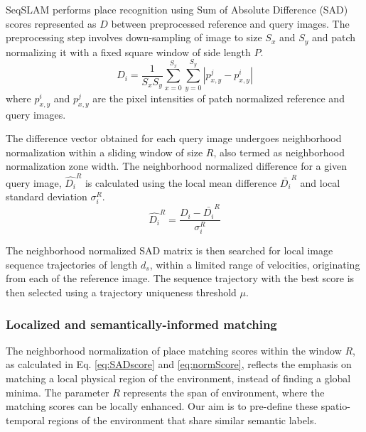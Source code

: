 \documentclass[letterpaper, 10 pt, conference]{ieeeconf}  %
\begin{document}
SeqSLAM performs place recognition using Sum of Absolute Difference (SAD) scores represented as $D$ between preprocessed reference and query images. The preprocessing step involves down-sampling of image to size $S_x$ and $S_y$ and patch normalizing it with a fixed square window of side length $P$.
\begin{equation}
 D_i = \frac{1}{S_xS_y} \sum\limits_{x=0}^{S_x}\sum\limits_{y=0}^{S_y}|p_{x,y}^j-p_{x,y}^i|
 \label{eq:SADscore}
\end{equation}
where $p_{x,y}^i$ and $p_{x,y}^j$ are the pixel intensities of patch normalized reference and query images.

The difference vector obtained for each query image undergoes neighborhood normalization within a sliding window of size $R$, also termed as neighborhood normalization zone width. The neighborhood normalized difference for a given query image, $\hat{D_i}^R$ is calculated using the local mean difference $\bar{D_i}^R$ and local standard deviation $\sigma_i^R$.
\begin{equation}
 \hat{D_i}^R = \frac{D_i-\bar{D_i}^R}{\sigma_i^R}
 \label{eq:normScore}
\end{equation}

The neighborhood normalized SAD matrix is then searched for local image sequence trajectories of length $d_s$, within a limited range of velocities, originating from each of the reference image. The sequence trajectory with the best score is then selected using a trajectory uniqueness threshold $\mu$.

\subsubsection{Localized and semantically-informed matching}
The neighborhood normalization of place matching scores within the window $R$, as calculated in Eq. \ref{eq:SADscore} and \ref{eq:normScore}, reflects the emphasis on matching a local physical region of the environment, instead of finding a global minima. The parameter $R$ represents the span of environment, where the matching scores can be locally enhanced. Our aim is to pre-define these spatio-temporal regions of the environment that share similar semantic labels. 
\end{document}
